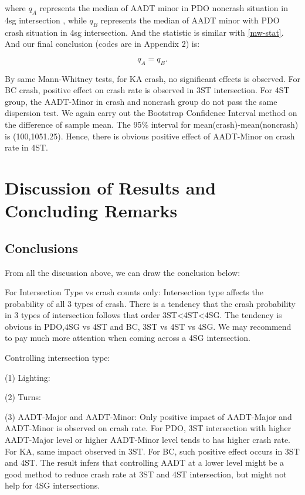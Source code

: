 \documentclass[11pt]{scrartcl} %
\begin{document}
where $q_A$ represents the median of AADT minor in PDO noncrash situation in 4sg intersection , while $q_B$ represents the median of AADT minor with PDO crash situation in 4sg intersection. And the statistic is similar with \eqref{mw-stat}. And our final conclusion (codes are in Appendix 2) is:

\begin{equation*}
{q_A} = {q_B}.
\end{equation*}

By same Mann-Whitney tests, for KA crash, no significant effects is observed. For BC crash, positive effect on crash rate is observed in 3ST intersection. For 4ST group, the AADT-Minor in crash and noncrash group do not pass the same dispersion test. We again carry out the Bootstrap Confidence Interval method on the difference of sample mean. The 95\% interval for mean(crash)-mean(noncrash) is (100,1051.25). Hence, there is obvious positive effect of AADT-Minor on crash rate in 4ST.


\section{Discussion of Results and Concluding Remarks}

\subsection{Conclusions}

From all the discussion above, we can draw the conclusion below:

For Intersection Type vs crash counts only: Intersection type affects the probability of all 3 types of crash. There is a tendency that the crash probability in 3 types of intersection follows that order 3ST<4ST<4SG. The tendency is obvious in PDO,4SG vs 4ST and BC, 3ST vs 4ST vs 4SG. We may recommend to pay much more attention when coming across a 4SG intersection.

Controlling intersection type:

(1) Lighting:

(2) Turns:

(3) AADT-Major and AADT-Minor: Only positive impact of AADT-Major and AADT-Minor is observed on crash rate. For PDO, 3ST intersection with higher AADT-Major level or higher AADT-Minor level tends to has higher crash rate. For KA, same impact observed in 3ST. For BC, such positive effect occurs in 3ST and 4ST. The result infers that controlling AADT at a lower level might be a good method to reduce crash rate at 3ST and 4ST intersection, but might not help for 4SG intersections.
\end{document}
